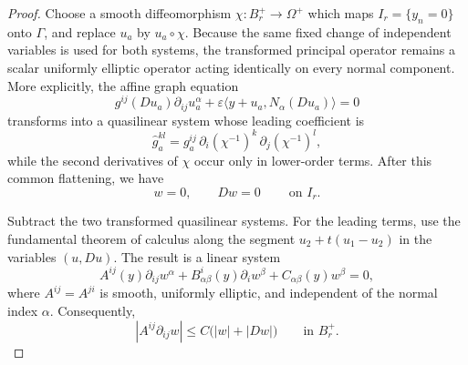 \documentclass[10pt,a4paper]{amsart}
\begin{document}
\begin{proof}
Choose a smooth diffeomorphism
$\chi:B_r^+\to\Omega^+$ which maps $I_r=\{y_n=0\}$ onto $\Gamma$, and replace
$u_a$ by $u_a\circ\chi$.  Because the same fixed change of independent
variables is used for both systems, the transformed principal operator remains
a scalar uniformly elliptic operator acting identically on every normal
component.  More explicitly, the affine graph equation
\begin{equation*}
        g^{ij}(Du_a)\partial_{ij}u_a^\alpha
        +\varepsilon\langle y+u_a,N_\alpha(Du_a)\rangle=0
\end{equation*}
transforms into a quasilinear system whose leading coefficient is
\begin{equation*}
        \widehat g_a^{kl}
        =g_a^{ij}\,\partial_i(\chi^{-1})^k\,\partial_j(\chi^{-1})^l,
\end{equation*}
while the second derivatives of $\chi$ occur only in lower-order terms.
After this common flattening, we have
\begin{equation}\label{eq:full-cauchy-data}
        w=0,
        \qquad
        Dw=0
        \qquad\ \text{on }I_r.
\end{equation}

Subtract the two transformed quasilinear systems.  For the leading terms,
use the fundamental theorem of calculus along the segment
$u_2+t(u_1-u_2)$ in the variables $(u,Du)$.  The result is a linear system
\begin{equation}
        A^{ij}(y)\partial_{ij}w^\alpha
        +B^i_{\alpha\beta}(y)\partial_iw^\beta
        +C_{\alpha\beta}(y)w^\beta=0,
\end{equation}
where $A^{ij}=A^{ji}$ is smooth, uniformly elliptic, and independent of the
normal index $\alpha$.  Consequently,
\begin{equation}
        |A^{ij}\partial_{ij}w|
        \le C\bigl(|w|+|Dw|\bigr)
        \qquad\text{in }B_r^+.
\end{equation}


\end{proof}
\end{document}
